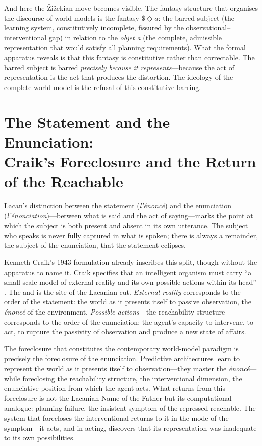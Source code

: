 \documentclass[10pt,a4paper]{article}
\begin{document}
And here the Žižekian move becomes visible. The fantasy structure that organises
the discourse of world models is the fantasy $\$ \Diamond a$: the barred subject
(the learning system, constitutively incomplete, fissured by the
observational--interventional gap) in relation to the \emph{objet a} (the
complete, admissible representation that would satisfy all planning requirements).
What the formal apparatus reveals is that this fantasy is constitutive rather
than correctable. The barred subject is barred \emph{precisely because it
represents}---because the act of representation is the act that produces the
distortion. The ideology of the complete world model is the refusal of this
constitutive barring.

\section{The Statement and the Enunciation:\\
Craik's Foreclosure and the Return of the Reachable}

Lacan's distinction between the statement (\emph{l'énoncé}) and the enunciation
(\emph{l'énonciation})---between what is said and the act of saying---marks
the point at which the subject is both present and absent in its own utterance.
The subject who speaks is never fully captured in what is spoken; there is always
a remainder, the subject of the enunciation, that the statement eclipses.

Kenneth Craik's 1943 formulation already inscribes this split, though without
the apparatus to name it. Craik specifies that an intelligent organism must carry
``a small-scale model of external reality and its own possible actions within its
head'' \citeyearpar{craik1943nature}. The and is the site of the Lacanian cut.
\emph{External reality} corresponds to the order of the statement: the world as
it presents itself to passive observation, the \emph{énoncé} of the environment.
\emph{Possible actions}---the reachability structure---corresponds to the order
of the enunciation: the agent's capacity to intervene, to act, to rupture the
passivity of observation and produce a new state of affairs.

The foreclosure that constitutes the contemporary world-model paradigm is
precisely the foreclosure of the enunciation. Predictive architectures learn to
represent the world as it presents itself to observation---they master the
\emph{énoncé}---while foreclosing the reachability structure, the interventional
dimension, the enunciative position from which the agent acts. What returns from
this foreclosure is not the Lacanian Name-of-the-Father but its computational
analogue: planning failure, the insistent symptom of the repressed reachable.
The system that forecloses the interventional returns to it in the mode of the
symptom---it acts, and in acting, discovers that its representation was
inadequate to its own possibilities.
\end{document}
